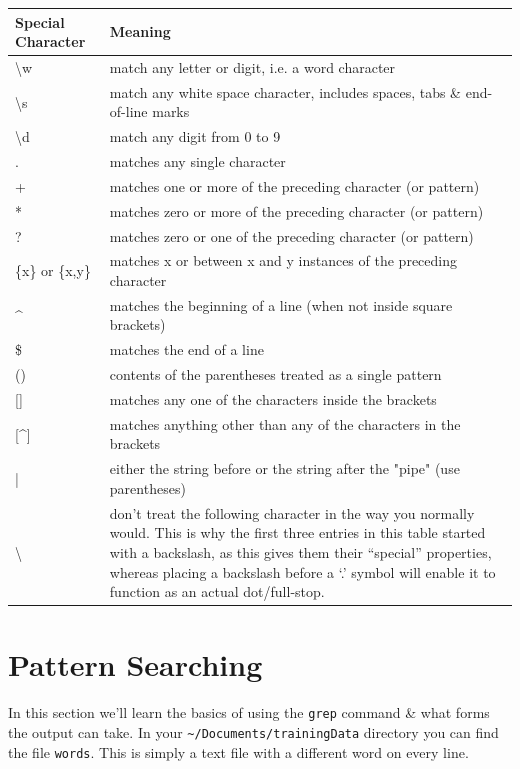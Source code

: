 \documentclass[a4paper,12pt,twoside]{memoir}
\begin{document}
\begin{center}
\renewcommand{\arraystretch}{1.6}
\begin{tabular}{|p{4cm} | p{} |}
\hline
Special Character & Meaning \\ \hline
\textbackslash w & match any letter or digit, i.e. a word character \\
\textbackslash s & match any white space character, includes spaces,
tabs \& end-of-line marks \\
\textbackslash d & match any digit from 0 to 9 \\
. & matches any single character \\
+ & matches one or more of the preceding character (or pattern) \\
\** & matches zero or more of the preceding character (or pattern) \\
? & matches zero or one of the preceding character (or pattern) \\
\{x\} or \{x,y\} & matches x or between x and y instances of the preceding
character \\
\^{} & matches the beginning of a line (when not inside square brackets) \\
\$ & matches the end of a line \\
() & contents of the parentheses treated as a single pattern \\
{[}] & matches any one of the characters inside the brackets \\
{[}\^{}] & matches anything other than any of the characters in the brackets \\
| & either the string before or the string after the "pipe" (use
parentheses) \\
\textbackslash & don't treat the following character in the way you normally would. This is why the first three entries in this table started with a backslash, as this gives them their ``special'' properties, whereas placing a backslash before a `.' symbol will enable it to function as an actual dot/full-stop. \\
\hline
\end{tabular}
\end{center}

\section{Pattern Searching}
In this section we'll learn the basics of using the \texttt{grep} command \& what forms the output can take.
In your \texttt{\~{}/Documents/trainingData} directory you can find the file \texttt{words}.
This is simply a text file with a different word on every line. \\
\end{document}
